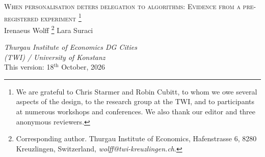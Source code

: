 \documentclass[a4paper, 12pt, fleqn]{article}
\title{\mytitle}
\date{}
\theoremstyle{hypstyle}
\newcommand{\symbolfootnote}[1]{\begingroup%
\renewcommand{\thefootnote}{\fnsymbol{footnote}}\footnote{#1}\endgroup}
\newcommand{\mytitle}{{\Large \textsc{When personalisation deters delegation to algorithms: Evidence from a pre-registered experiment}}}
\begin{document}
 
\thispagestyle{empty}
\begin{center}
	\mytitle\symbolfootnote{We are grateful to Chris Starmer and Robin Cubitt, to whom we owe several aspects of the design, to the research group at the TWI, and to participants at numerous workshops and conferences. We also thank our editor and three anonymous reviewers.}
  \vspace{.55cm}\\
 Irenaeus Wolff\symbolfootnote{Corresponding author. Thurgau Institute of Economics, Hafenstrasse 6, 8280 Kreuzlingen, Switzerland, \textit{wolff@twi-kreuzlingen.ch}.} \qquad\qquad\qquad Lara Suraci
\\\vspace{.25cm}
 \begin{small}
  \textit{Thurgau Institute of Economics\phantom{text} \qquad\qquad DG Cities\phantom{moretext} \\ (TWI) / University of Konstanz \qquad\qquad \phantom{moretext University} } 
  \vspace{.03cm}\\
\vspace{.6cm}
 {This version: 18$^\text{th}$ October, 2026}
\vspace{.6cm}
\end{small}
\end{center}
\end{document}
